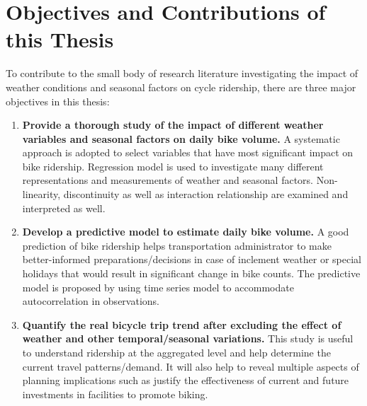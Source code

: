 \documentclass [11pt, proquest] {uwthesis}[2015/03/03]
\begin{document}
\section{Objectives and Contributions of this Thesis}
To contribute to the small body of research literature investigating the impact of weather conditions and seasonal factors on cycle ridership, there are three major objectives in this thesis:
\begin{enumerate}
\item \textbf{Provide a thorough study of the impact of different weather variables and seasonal factors on daily bike volume.} A systematic approach is adopted to select variables that have most significant impact on bike ridership. Regression model is used to investigate many different representations and measurements of weather and seasonal factors. Non-linearity, discontinuity as well as interaction relationship are examined and interpreted as well. 

\item \textbf{Develop a predictive model to estimate daily bike volume.} A good prediction of bike ridership helps transportation administrator to make better-informed preparations/decisions in case of inclement weather or special holidays that would result in significant change in bike counts. The predictive model is proposed by using time series model to accommodate autocorrelation in observations. 

\item \textbf{Quantify the real bicycle trip trend after excluding the effect of weather and other temporal/seasonal variations.} This study is useful to understand ridership at the aggregated level and help determine the current travel patterns/demand. It will also help to reveal multiple aspects of planning implications such as justify the effectiveness of current and future investments in facilities to promote biking.
\end{enumerate}
\end{document}
